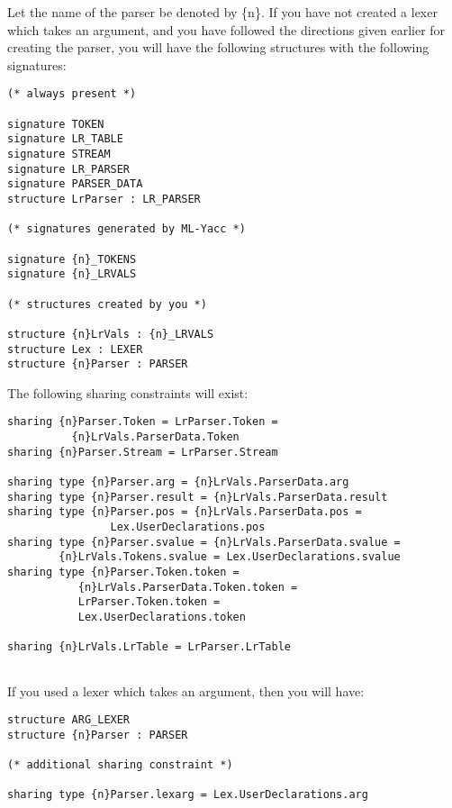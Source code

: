 Let the name of the parser be denoted by \{n\}.  If
you have not created a lexer which takes an argument, and
you have followed the directions given earlier for creating the parser, you
will have the following structures with the following signatures:
\begin{tt}
\begin{verbatim}
(* always present *)

signature TOKEN
signature LR_TABLE
signature STREAM
signature LR_PARSER
signature PARSER_DATA
structure LrParser : LR_PARSER

(* signatures generated by ML-Yacc *)

signature {n}_TOKENS
signature {n}_LRVALS

(* structures created by you *)

structure {n}LrVals : {n}_LRVALS
structure Lex : LEXER
structure {n}Parser : PARSER
\end{verbatim}
\end{tt}

The following sharing constraints will exist:
\begin{tt}
\begin{verbatim}
sharing {n}Parser.Token = LrParser.Token =
          {n}LrVals.ParserData.Token
sharing {n}Parser.Stream = LrParser.Stream

sharing type {n}Parser.arg = {n}LrVals.ParserData.arg
sharing type {n}Parser.result = {n}LrVals.ParserData.result
sharing type {n}Parser.pos = {n}LrVals.ParserData.pos =
                Lex.UserDeclarations.pos
sharing type {n}Parser.svalue = {n}LrVals.ParserData.svalue =
        {n}LrVals.Tokens.svalue = Lex.UserDeclarations.svalue
sharing type {n}Parser.Token.token =
           {n}LrVals.ParserData.Token.token =
           LrParser.Token.token =
           Lex.UserDeclarations.token

sharing {n}LrVals.LrTable = LrParser.LrTable
        
\end{verbatim}
\end{tt}

If you used a lexer which takes an argument, then you will
have:
\begin{tt}
\begin{verbatim}
structure ARG_LEXER
structure {n}Parser : PARSER

(* additional sharing constraint *)

sharing type {n}Parser.lexarg = Lex.UserDeclarations.arg
\end{verbatim}
\end{tt}

